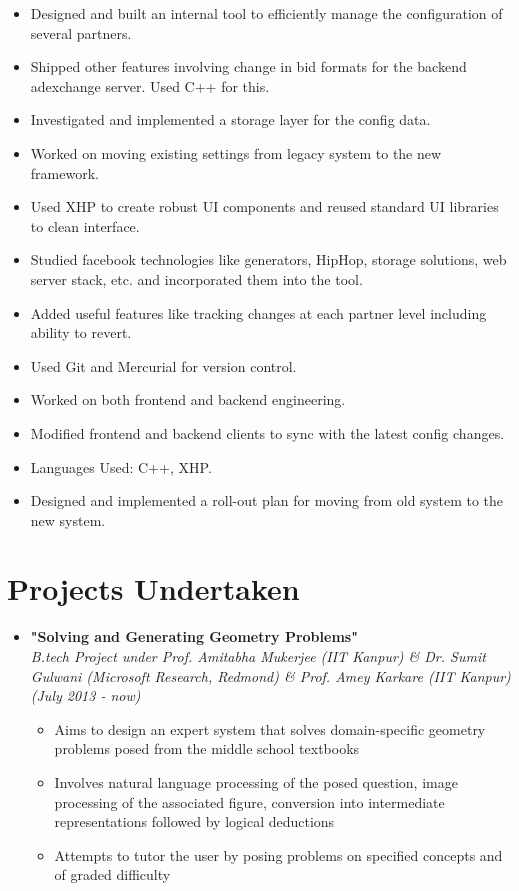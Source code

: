 \documentclass[margin,line]{resume}
\begin{document}
\begin{resume}
\begin{itemize}
\begin{itemize}
\begin{itemize}
      \item Designed and built an internal tool to efficiently manage the configuration of several partners.
      \item Shipped other features involving change in bid formats for the backend adexchange server. Used C++ for this.
      \item Investigated and implemented a storage layer for the config data.
      \item Worked on moving existing settings from legacy system to the new framework.
      \item Used XHP to create robust UI components and reused standard UI libraries to clean interface.
      \item Studied facebook technologies like generators, HipHop, storage solutions, web server stack, etc. and incorporated them into the tool.
      \item Added useful features like tracking changes at each partner level including ability to revert.
      \item Used Git and Mercurial for version control.
      \item Worked on both frontend and backend engineering.
      \item Modified frontend and backend clients to sync with the latest config changes.
      \item Languages Used: C++, XHP.
      \item Designed and implemented a roll-out plan for moving from old system to the new system.
      \end{itemize}
    \end{itemize}
  \end{itemize}

  \section{\mysidestyle Projects Undertaken}

  \begin{itemize}
  \item \large{\textbf{\textsf{"Solving and Generating Geometry Problems"}}}
    \\ \small{\textit{B.tech Project under Prof. Amitabha Mukerjee (IIT Kanpur) \& Dr. Sumit Gulwani (Microsoft Research, Redmond) \& Prof. Amey Karkare (IIT Kanpur) (July 2013 - now)}}
    \normalsize
    \begin{itemize}
    \item Aims to design an expert system that solves domain-specific geometry problems posed from the middle school textbooks
    \item Involves natural language processing of the posed question, image processing of the associated figure, conversion into intermediate representations followed by logical deductions
    \item Attempts to tutor the user by posing problems on specified concepts and of graded difficulty
    \end{itemize}


\end{itemize}
\end{resume}
\end{document}
